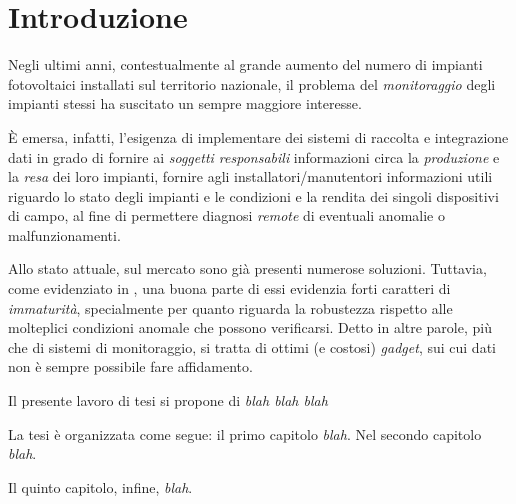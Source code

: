 \clearpage{\pagestyle{empty}\cleardoublepage}
\chapter*{Introduzione} 
%
Negli ultimi anni, contestualmente al grande aumento del 
numero di impianti fotovoltaici installati sul territorio 
nazionale\cite{gse2010}, il problema del \emph{monitoraggio} 
degli impianti stessi ha suscitato un sempre maggiore 
interesse.
%

%
\`E emersa, infatti, l'esigenza di implementare dei sistemi 
di raccolta e integrazione dati in grado di  fornire ai 
\emph{soggetti responsabili} informazioni circa la 
\emph{produzione} e la \emph{resa} dei loro impianti, 
 fornire agli installatori/manutentori informazioni utili 
riguardo lo stato degli impianti e le condizioni e la 
rendita dei singoli dispositivi di campo, al fine di permettere 
diagnosi \emph{remote} di eventuali anomalie o malfunzionamenti.
%

%
Allo stato attuale, sul mercato sono gi\`a presenti numerose 
soluzioni. Tuttavia, come evidenziato in \cite{photon2010}, una 
buona parte di essi evidenzia forti caratteri di \emph{immaturit\`a}, 
specialmente per quanto riguarda la robustezza rispetto alle 
molteplici condizioni anomale che possono verificarsi.
%
Detto in altre parole, pi\`u che di sistemi di monitoraggio, 
si tratta di ottimi (e costosi) \emph{gadget}, sui cui dati 
non \`e sempre possibile fare affidamento. 
%

%
Il presente lavoro di tesi si propone di \emph{blah blah blah}

%
La tesi \`e organizzata come segue: il primo capitolo \emph{blah}.
Nel secondo capitolo \emph{blah}.
%

%
Il quinto capitolo, infine, \emph{blah}.
